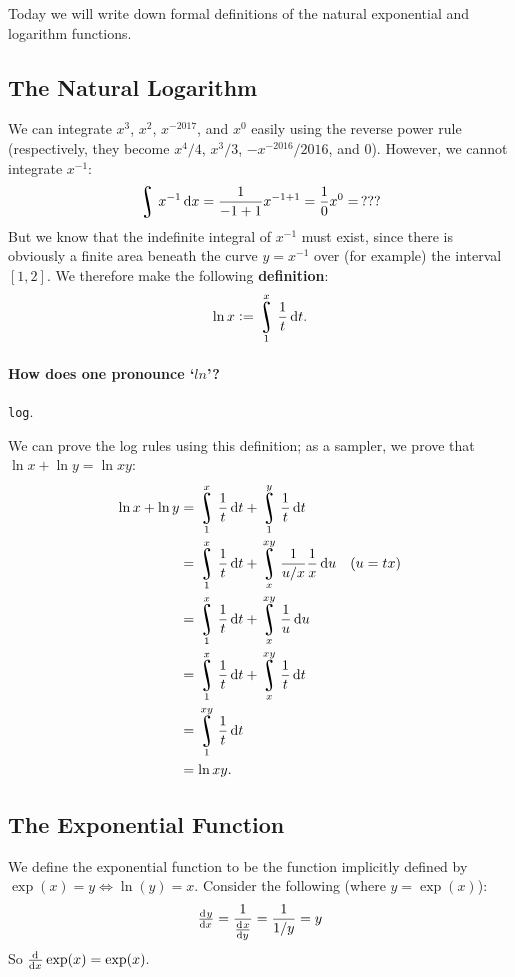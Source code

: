 


Today we will write down formal definitions of the natural exponential and logarithm functions.

\subsection*{The Natural Logarithm}
We can integrate $ x^3 $, $ x^2 $, $ x^{-2017} $, and $ x^{0} $ easily using the reverse power rule
(respectively, they become $ x^4/4 $, $ x^3/3 $, $ -x^{-2016}/2016 $, and $ 0 $). However, we cannot
integrate $ x^{-1} $:
\begin{displaymath}
  \rint x^{-1} \dif{x} = \frac{1}{-1 + 1} x^{-1 + 1} = \frac{1}{0} x^0 =\thinspace ???
\end{displaymath}
But we know that the indefinite integral of $ x^{-1} $ must exist, since there is obviously a
finite area beneath the curve $ y = x^{-1} $ over (for example) the interval $ [1,2] $. We therefore
make the following \textbf{definition}:
\begin{displaymath}
  \ln x := \rint^x_1 \frac{1}{t} \dif{t}.
\end{displaymath}

\paragraph{How does one pronounce `$ ln $'?} \texttt{log}.

We can prove the log rules using this definition; as a sampler, we prove that $ \ln x + \ln y = \ln xy $:
\begin{align*}
  \ln x + \ln y &= \rint^x_1 \frac{1}{t} \dif{t} + \rint^y_1 \frac{1}{t} \dif{t}\\
                &= \rint^x_1 \frac{1}{t} \dif{t} + \rint^{xy}_{x} \frac{1}{u/x} \frac{1}{x} \dif{u} \quad\text{($u = tx $)}\\
                &= \rint^x_1 \frac{1}{t} \dif{t} + \rint^{xy}_{x} \frac{1}{u} \dif{u}\\
                &= \rint^x_1 \frac{1}{t} \dif{t} + \rint^{xy}_{x} \frac{1}{t} \dif{t}\\
                &= \rint^{xy}_1 \frac{1}{t} \dif{t}\\
                &= \ln xy.
\end{align*}

\newpage
\subsection*{The Exponential Function}
We define the exponential function to be the function implicitly defined by $ \exp(x) = y \iff \ln(y) = x $. Consider the following (where $ y = \exp(x) $):
\begin{align*}
  \od{y}{x} = \frac{1}{\od{x}{y}} = \frac{1}{1/y} = y
\end{align*}
So $ \od{}{x} \exp(x) = \exp(x). $

